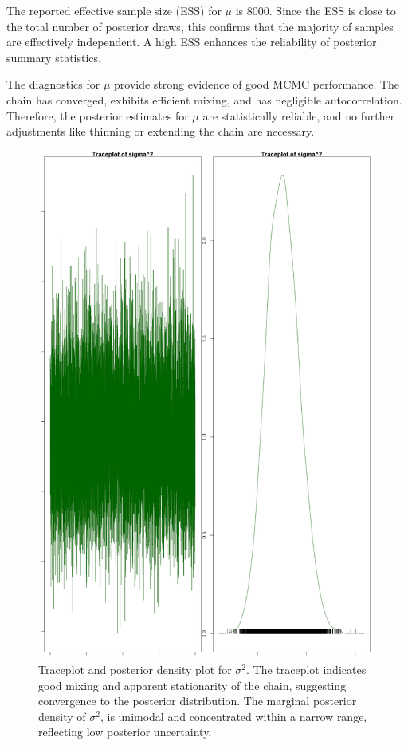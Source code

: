 \documentclass[]{article}
\begin{document}
The reported effective sample size (ESS) for $\mu$ is 8000. Since the ESS is close to the total number of posterior draws, this confirms that the majority of samples are effectively independent. A high ESS enhances the reliability of posterior summary statistics.

The diagnostics for $\mu$ provide strong evidence of good MCMC performance. The chain has converged, exhibits efficient mixing, and has negligible autocorrelation. Therefore, the posterior estimates for $\mu$ are statistically reliable, and no further adjustments like thinning or extending the chain are necessary.


\begin{figure}[H]
	\centering
	\includegraphics[width=0.7\linewidth]{img/img-traceplot-var}
    \caption{Traceplot and posterior density plot for  $\sigma^2$. The traceplot indicates good mixing and apparent stationarity of the chain, suggesting convergence to the posterior distribution. The marginal posterior density of $\sigma^2$,  is unimodal and concentrated within a narrow range, reflecting low posterior uncertainty.}
	\label{fig:img-traceplot-var}
\end{figure}
\end{document}
